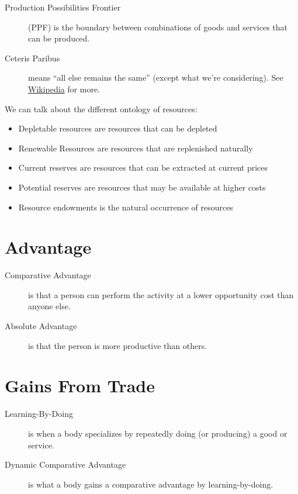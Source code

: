                 \begin{description}
                    \item[Production Possibilities Frontier] (PPF) is the boundary between combinations of goods and services that can be produced.
                    \item[Ceteris Paribus] means ``all else remains the same'' (except what we're considering). See \href{https://en.wikipedia.org/wiki/Ceteris_paribus}{Wikipedia} for more.
                \end{description}
                We can talk about the different ontology of resources:
                \begin{itemize}
                    \item Depletable resources are resources that can be depleted
                    \item Renewable Resources are resources that are replenished naturally
                \end{itemize}
                \begin{itemize}
                    \item Current reserves are resources that can be extracted at current prices
                    \item Potential reserves are resources that may be available at higher costs
                    \item Resource endowments is the natural occurrence of resources
                \end{itemize}
            \section{Advantage} %
            \label{sec:advantage}
                \begin{description}
                    \item[Comparative Advantage] is that a person can perform the activity at a lower opportunity cost than anyone else.
                    \item[Absolute Advantage] is that the person is more productive than others.
                \end{description}
            \section{Gains From Trade} %
            \label{sec:gains_from_trade}
                \begin{description}
                    \item[Learning-By-Doing] is when a body specializes by repeatedly doing (or producing) a good or service.
                    \item[Dynamic Comparative Advantage] is what a body gains a comparative advantage by learning-by-doing.
                \end{description}
